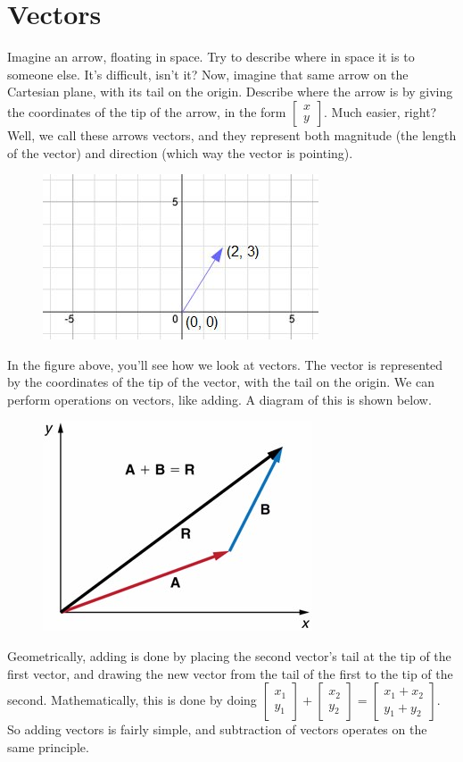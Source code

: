  \section{Vectors}
Imagine an arrow, floating in space. Try to describe where in space it is to someone else. It's difficult, isn't it?
Now, imagine that same arrow on the Cartesian plane, with its tail on the origin. Describe where the arrow is by giving the coordinates of the tip of the arrow, in the form $\begin{bmatrix}x\\y\end{bmatrix}$.
Much easier, right? Well, we call these arrows vectors, and they represent both magnitude (the length of the vector) and direction (which way the vector is pointing). 
\begin{figure}[H]
\includegraphics{visualvectordotproduct1.jpg}
\end{figure}
In the figure above, you'll see how we look at vectors. The vector is represented by the coordinates of the tip of the vector, with the tail on the origin. We can perform operations on vectors, like adding. A diagram of this is shown below.
\begin{figure}[H]
\includegraphics{Figure_03_03_05a.jpg}
\end{figure}
Geometrically, adding is done by placing the second vector's tail at the tip of the first vector, and drawing the new vector from the tail of the first to the tip of the second. Mathematically, this is done by doing $\begin{bmatrix}x_1\\y_1\end{bmatrix}+\begin{bmatrix}x_2\\y_2\end{bmatrix}=\begin{bmatrix}x_1+x_2\\y_1+y_2\end{bmatrix}$. So adding vectors is fairly simple, and subtraction of vectors operates on the same principle.
